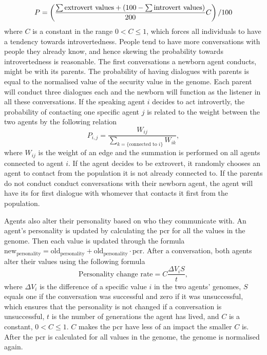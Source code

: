 \begin{equation}\label{eq:chooseListener}
P = \left( \frac{\sum \text{extrovert values} + (100 - \sum \text{introvert values})}{200}C \right)/100
\end{equation}
where $C$ is a constant in the range $0 < C \leq 1$, which forces all individuals to have a tendency towards introvertedness. People tend to have more conversations with people they already know, and hence skewing the probability towards introvertedness is reasonable. The first conversations a newborn agent conducts, might be with its parents. The probability of having dialogues with parents is equal to the normalised value of the security value in the genome. Each parent will conduct three dialogues each and the newborn will function as the listener in all these conversations. If the speaking agent $i$ decides to act introvertly, the probability of contacting one specific agent $j$ is related to the weight between the two agents by the following relation
\begin{equation}\label{eq:intrvertListener}
P_{i,j} = \frac{W_{ij}}{\sum_{k=\{\text{connected to } i\}} {W_{ik}}},
\end{equation}
where $W_{ij}$ is the weight of an edge and the summation is performed on all agents connected to agent $i$. If the agent decides to be extrovert, it randomly chooses an agent to contact from the population it is not already connected to. If the parents do not conduct conduct conversations with their newborn agent, the agent will have its for first dialogue with whomever that contacts it first from the population.

\clearpage
Agents also alter their personality based on who they communicate with. An agent's personality is updated by calculating the \ac{pcr} for all the values in the genome. Then each value is updated through the formula $\mathrm{new_{personality}} = \mathrm{old_{personality}} + \mathrm{old_{personality}} \cdot \mathrm{pcr}$. After a conversation, both agents alter their values using the following formula
\begin{equation}\label{eq:PCR}
\text{Personality change rate} = C\frac{\Delta V_i S}{t},
\end{equation}
where $\Delta V_i$ is the difference of a specific value $i$ in the two agents' genomes, $S$ equals one if the conversation was successful and zero if it was unsuccessful, which ensures that the personality is not changed if a conversation is unsuccessful, $t$ is the number of generations the agent has lived, and $C$ is a constant, $0 < C \leq 1$. $C$ makes the \ac{pcr} have less of an impact the smaller $C$ is. After the \ac{pcr} is calculated for all values in the genome, the genome is normalised again.

